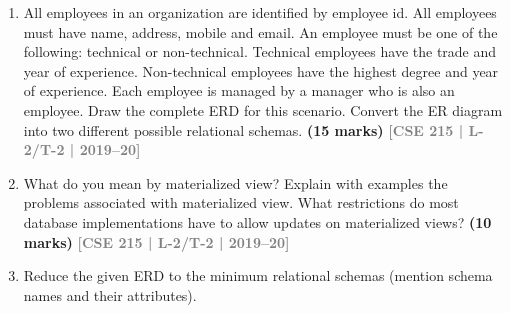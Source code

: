 \documentclass[12pt,a3paper]{article}
\newcommand{\yr}[1]{\hfill\textcolor{gray}{\small\textbf{[#1]}}}
\newcommand{\mk}[1]{\textcolor{orange!70!black}{\small\textbf{(#1 marks)}}}
\begin{document}
\begin{enumerate}
\item All employees in an organization are identified by employee id. All employees must have name, address, mobile and email. An employee must be one of the following: technical or non-technical. Technical employees have the trade and year of experience. Non-technical employees have the highest degree and year of experience. Each employee is managed by a manager who is also an employee. Draw the complete ERD for this scenario. Convert the ER diagram into two different possible relational schemas.
\mk{15} \yr{CSE 215 | L-2/T-2 | 2019--20}

\item What do you mean by materialized view? Explain with examples the problems associated with materialized view. What restrictions do most database implementations have to allow updates on materialized views?
\mk{10} \yr{CSE 215 | L-2/T-2 | 2019--20}

\item Reduce the given ERD to the minimum relational schemas (mention schema names and their attributes).

\begin{center}
\end{center}
\end{enumerate}
\end{document}
